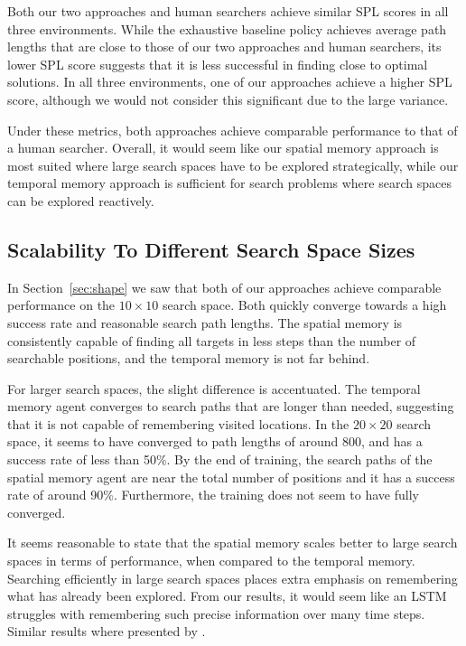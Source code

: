 Both our two approaches and human searchers achieve similar SPL scores in all three environments.
While the exhaustive baseline policy achieves average path lengths that are close to those of our two approaches and human searchers, its lower SPL score suggests that it is less successful in finding close to optimal solutions.
In all three environments, one of our approaches achieve a higher SPL score,
although we would not consider this significant due to the large variance.

Under these metrics, both approaches achieve comparable performance to that of a human searcher. 
Overall, it would seem like our spatial memory approach is most suited where large search spaces have to be explored strategically, while our temporal memory approach is sufficient for search problems where search spaces can be explored reactively.

\subsection{Scalability To Different Search Space Sizes}

In Section~\ref{sec:shape} we saw that both of our approaches achieve comparable performance on the \(10 \times 10\) search space.
Both quickly converge towards a high success rate and reasonable search path lengths.
The spatial memory is consistently capable of finding all targets in less steps than the number of searchable positions, and the temporal memory is not far behind.

For larger search spaces, the slight difference is accentuated.
The temporal memory agent converges to search paths that are longer than needed, suggesting that it is not capable of remembering visited locations.
In the \(20 \times 20\) search space, it seems to have converged to path lengths of around 800, and has a success rate of less than 50\%.
By the end of training, the search paths of the spatial memory agent are near the total number of positions and it has a success rate of around 90\%.
Furthermore, the training does not seem to have fully converged.

It seems reasonable to state that the spatial memory scales better to large search spaces in terms of performance, when compared to the temporal memory.
Searching efficiently in large search spaces places extra emphasis on remembering what has already been explored.
From our results, it would seem like an LSTM struggles with remembering such precise information over many time steps.
Similar results where presented by \cite{oh_control_2016}.

